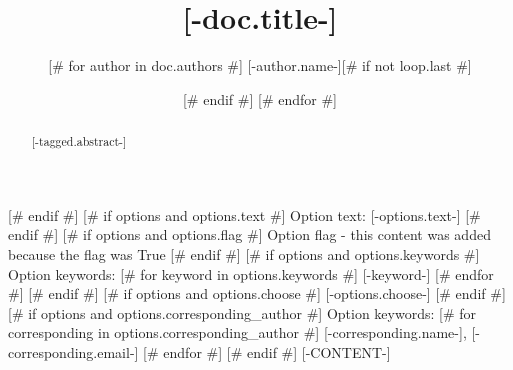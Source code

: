 \title{[-doc.title-]}
\author{[# for author in doc.authors #]
[-author.name-][# if not loop.last #] \and [# endif #]
[# endfor #]
}

\begin{abstract}
[-tagged.abstract-]
\end{abstract}
[# endif #]
[# if options and options.text #]
Option text: [-options.text-]
[# endif #]
[# if options and options.flag #]
Option flag - this content was added because the flag was True
[# endif #]
[# if options and options.keywords #]
Option keywords:
[# for keyword in options.keywords #]
[-keyword-]
[# endfor #]
[# endif #]
[# if options and options.choose #]
[-options.choose-]
[# endif #]
[# if options and options.corresponding_author #]
Option keywords:
[# for corresponding in options.corresponding_author #]
[-corresponding.name-], [-corresponding.email-]
[# endfor #]
[# endif #]
[-CONTENT-]
